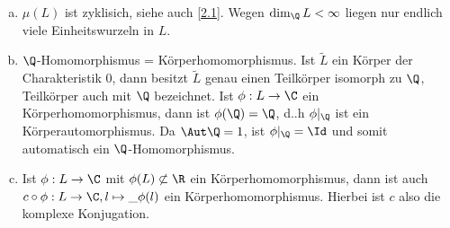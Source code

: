 \begin{nt} \label{8.29}
	\begin{enumerate}[a)]
		\item
			$\mu(L)$ ist zyklisich, siehe auch \ref{2.1}.
			Wegen $\dim_{\Q} L < \infty$ liegen nur endlich viele Einheitswurzeln in $L$.
		\item
			$\Q$-Homomorphismus = Körperhomomorphismus.
			Ist $\tilde L$ ein Körper der Charakteristik $0$, dann besitzt $\tilde L$ genau einen Teilkörper isomorph zu $\Q$, Teilkörper auch mit $\Q$ bezeichnet.
			Ist $\phi: L \to \C$ ein Körperhomomorphismus, dann ist $\phi(\Q) = \Q$, d..h $\phi|_\Q$ ist ein Körperautomorphismus.
			Da $\Aut \Q = 1$, ist $\phi|_\Q = \Id$ und somit automatisch ein $\Q$-Homomorphismus.
		\item
			Ist $\phi: L \to \C$ mit $\phi(L) \not\subset \R$ ein Körperhomomorphismus, dann ist auch $c \circ \phi: L \to \C, l \mapsto \_{\phi(l)}$ ein Körperhomomorphismus.
			Hierbei ist $c$ also die komplexe Konjugation.
	\end{enumerate}
\end{nt}

